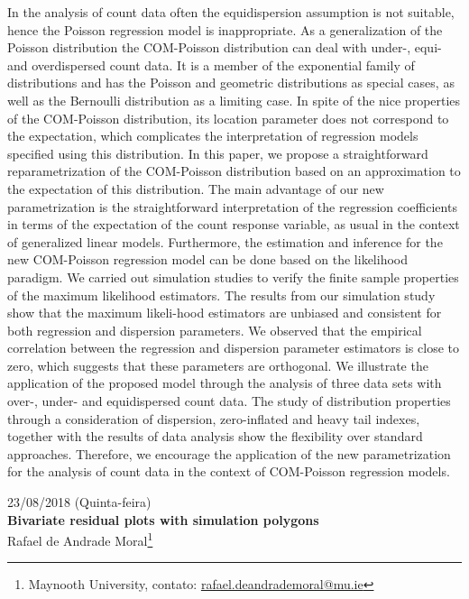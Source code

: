 \documentclass[9pt, a5paper]{article}
\begin{document}
In the analysis of count data often the equidispersion assumption is not
suitable, hence the Poisson regression model is inappropriate. As a
generalization of the Poisson distribution the COM-Poisson distribution
can deal with under-, equi- and overdispersed count data. It is a member
of the exponential family of distributions and has the Poisson and
geometric distributions as special cases, as well as the Bernoulli
distribution as a limiting case. In spite of the nice properties of the
COM-Poisson distribution, its location parameter does not correspond to
the expectation, which complicates the interpretation of regression
models specified using this distribution. In this paper, we propose a
straightforward reparametrization of the COM-Poisson distribution based
on an approximation to the expectation of this distribution. The main
advantage of our new parametrization is the straightforward
interpretation of the regression coefficients in terms of the
expectation of the count response variable, as usual in the context of
generalized linear models. Furthermore, the estimation and inference for
the new COM-Poisson regression model can be done based on the likelihood
paradigm. We carried out simulation studies to verify the finite sample
properties of the maximum likelihood estimators. The results from our
simulation study show that the maximum likeli-hood estimators are
unbiased and consistent for both regression and dispersion
parameters. We observed that the empirical correlation between the
regression and dispersion parameter estimators is close to zero, which
suggests that these parameters are orthogonal. We illustrate the
application of the proposed model through the analysis of three data
sets with over-, under- and equidispersed count data. The study of
distribution properties through a consideration of dispersion,
zero-inflated and heavy tail indexes, together with the results of data
analysis show the flexibility over standard approaches. Therefore, we
encourage the application of the new parametrization for the analysis of
count data in the context of COM-Poisson regression models.

\clearpage


\begin{center}
  {\footnotesize 23/08/2018 (Quinta-feira)}\\
  \textbf{\large
    Bivariate residual plots with simulation polygons}\\
  Rafael de Andrade Moral\footnote{Maynooth University, contato:
    \url{rafael.deandrademoral@mu.ie}}
\end{center}
\end{document}
